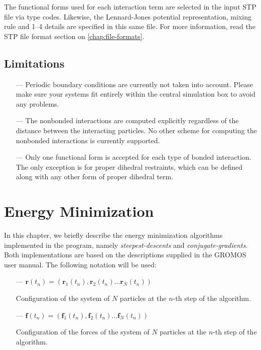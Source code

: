 \documentclass[10pt,a4paper]{report}
\numberwithin{equation}{section}
\newcommand{\rsub}[1]{\mathbf{r}_{#1}}
\newcommand{\fsub}[1]{\mathbf{f}_{#1}}
\begin{document}
The functional forms used for each interaction term are selected in
the input STP file via type codes. Likewise, the Lennard-Jones
potential representation, mixing rule and 1--4 details are specified
in this same file. For more information, read the STP file format
section on \autoref{chap:file-formats}.

\section{Limitations}
\label{sec:limitations}

\begin{itemize}
\item[---] Periodic boundary conditions are currently not taken into
  account. Please make sure your systems fit entirely within the
  central simulation box to avoid any problems.
\item[---] The nonbonded interactions are computed explicitly
  regardless of the distance between the interacting particles. No
  other scheme for computing the nonbonded interactions is currently
  supported.
\item[---] Only one functional form is accepted for each type of
  bonded interaction. The only exception is for proper dihedral
  restraints, which can be defined along with any other form of proper
  dihedral term. 
\end{itemize}

\chapter{Energy Minimization}
\label{chap:minim}

In this chapter, we briefly describe the energy minimization algorithms implemented in the program, namely
\textit{steepest-descents} and
\textit{conjugate-gradients}.
Both implementations are based on the descriptions supplied in the GROMOS user manual\cite{GROMOS-doc}.
The following notation will be used:

\begin{itemize}
\item [---] $\mathbf{r}(t_n) = (\rsub{1}(t_n),\rsub{2}(t_n)\ldots\rsub{N}(t_n))$
  \par
  \hspace{10ex}
  Configuration of the system of $N$ particles at the $n$-th step of the algorithm.
\item [---] $\mathbf{f}(t_n) = (\fsub{1}(t_n),\fsub{2}(t_n)\ldots\fsub{N}(t_n))$
  \par
  \hspace{10ex}
  Configuration of the forces of the system of $N$ particles at the $n$-th step of the algorithm.
\end{itemize}
\end{document}

